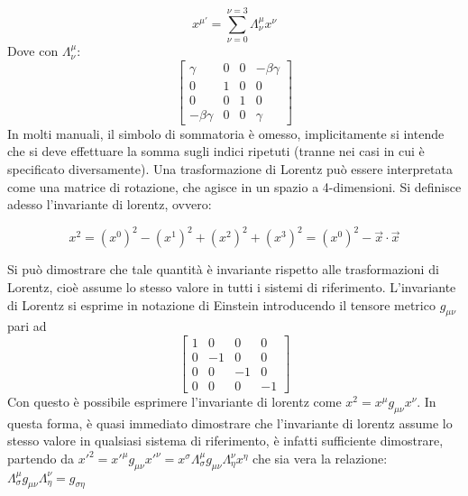 \documentclass[12pt,a4paper,twoside]{book}
\begin{document}
\begin{equation}
x^{\mu'} = \sum _{\nu = 0}^{\nu = 3} \Lambda^\mu_\nu x^\nu 
\end{equation}
Dove con $\Lambda^\mu_\nu$:
\[
\begin{bmatrix}
\gamma & 0 & 0 & -\beta \gamma \\ 
0 & 1 & 0 & 0 \\ 
0 & 0 & 1 & 0 \\ 
- \beta \gamma & 0 & 0 & \gamma
\end{bmatrix} 
\]
In molti manuali, il simbolo di sommatoria è omesso, implicitamente si intende che si deve effettuare la somma sugli indici ripetuti (tranne nei casi in cui è specificato diversamente).
Una trasformazione di Lorentz può essere interpretata come una matrice di rotazione, che agisce in un spazio a 4-dimensioni. Si definisce adesso l'invariante di lorentz, ovvero:

\begin{equation*}
x^2 = (x^0)^2 - (x^1)^2 + (x^2)^2 + (x^3)^2 = (x^0)^2 - \vec{x} \cdot \vec{x}
\end{equation*}

Si può dimostrare che tale quantità è invariante rispetto alle trasformazioni di Lorentz, cioè assume lo stesso valore in tutti i sistemi di riferimento.
L'invariante di Lorentz si esprime in notazione di Einstein introducendo il tensore metrico $g_{\mu \nu}$ pari ad 
\begin{equation} \label{metric}
\begin{bmatrix}
1 & 0 & 0 & 0 \\ 
0 & -1 & 0 & 0 \\ 
0 & 0 & -1 & 0 \\ 
0 & 0 & 0 &-1
\end{bmatrix}
\end{equation} 
Con questo è possibile esprimere l'invariante di lorentz come $x^2 = x^\mu g_{\mu \nu} x^\nu $. In questa forma, è quasi immediato dimostrare che l'invariante di lorentz assume lo stesso valore in qualsiasi sistema di riferimento, è infatti sufficiente dimostrare, partendo da $x'^2 =  x'^\mu g_{\mu \nu} x'^\nu = x^\sigma \Lambda^\mu _\sigma g_{\mu \nu} \Lambda^\nu _\eta x^\eta $ che sia vera la relazione:  $ \Lambda^\mu _\sigma g_{\mu \nu} \Lambda^\nu _\eta = g_{\sigma \eta}$ 
\end{document}
